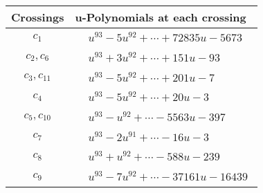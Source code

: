 \documentclass[1p]{elsarticle_modified}
\theoremstyle{definition}
\begin{document}
\begin{tabular}{m{50pt}|m{274pt}}
Crossings & \hspace{64pt}u-Polynomials at each crossing \\
\hline $$\begin{aligned}c_{1}\end{aligned}$$&$\begin{aligned}
&u^{93}-5 u^{92}+\cdots+72835 u-5673
\end{aligned}$\\
\hline $$\begin{aligned}c_{2},c_{6}\end{aligned}$$&$\begin{aligned}
&u^{93}+3 u^{92}+\cdots+151 u-93
\end{aligned}$\\
\hline $$\begin{aligned}c_{3},c_{11}\end{aligned}$$&$\begin{aligned}
&u^{93}-5 u^{92}+\cdots+201 u-7
\end{aligned}$\\
\hline $$\begin{aligned}c_{4}\end{aligned}$$&$\begin{aligned}
&u^{93}-5 u^{92}+\cdots+20 u-3
\end{aligned}$\\
\hline $$\begin{aligned}c_{5},c_{10}\end{aligned}$$&$\begin{aligned}
&u^{93}- u^{92}+\cdots-5563 u-397
\end{aligned}$\\
\hline $$\begin{aligned}c_{7}\end{aligned}$$&$\begin{aligned}
&u^{93}-2 u^{91}+\cdots-16 u-3
\end{aligned}$\\
\hline $$\begin{aligned}c_{8}\end{aligned}$$&$\begin{aligned}
&u^{93}+u^{92}+\cdots-588 u-239
\end{aligned}$\\
\hline $$\begin{aligned}c_{9}\end{aligned}$$&$\begin{aligned}
&u^{93}-7 u^{92}+\cdots-37161 u-16439
\end{aligned}$\\
\hline
\end{tabular}\\~\\
\end{document}
